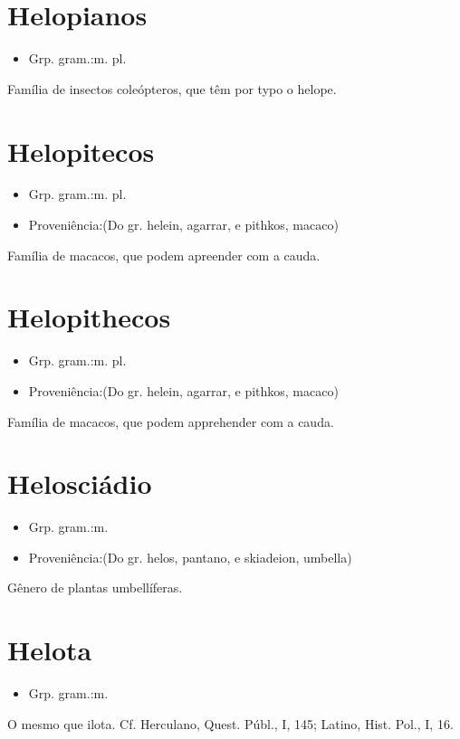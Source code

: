\documentclass{article}
\begin{document}
\section{Helopianos}
\begin{itemize}
\item {Grp. gram.:m. pl.}
\end{itemize}
Família de insectos coleópteros, que têm por typo o helope.
\section{Helopitecos}
\begin{itemize}
\item {Grp. gram.:m. pl.}
\end{itemize}
\begin{itemize}
\item {Proveniência:(Do gr. \textunderscore helein\textunderscore , agarrar, e \textunderscore pithkos\textunderscore , macaco)}
\end{itemize}
Família de macacos, que podem apreender com a cauda.
\section{Helopithecos}
\begin{itemize}
\item {Grp. gram.:m. pl.}
\end{itemize}
\begin{itemize}
\item {Proveniência:(Do gr. \textunderscore helein\textunderscore , agarrar, e \textunderscore pithkos\textunderscore , macaco)}
\end{itemize}
Família de macacos, que podem apprehender com a cauda.
\section{Helosciádio}
\begin{itemize}
\item {Grp. gram.:m.}
\end{itemize}
\begin{itemize}
\item {Proveniência:(Do gr. \textunderscore helos\textunderscore , pantano, e \textunderscore skiadeion\textunderscore , umbella)}
\end{itemize}
Gênero de plantas umbellíferas.
\section{Helota}
\begin{itemize}
\item {Grp. gram.:m.}
\end{itemize}
O mesmo que \textunderscore ilota\textunderscore . Cf. Herculano, \textunderscore Quest. Públ.\textunderscore , I, 145; Latino, \textunderscore Hist. Pol.\textunderscore , I, 16.
\end{document}
